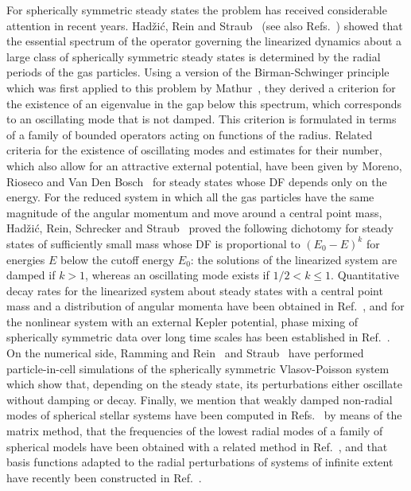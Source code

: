 For spherically symmetric steady states the problem has received considerable attention in recent years. Had\v{z}i\'c, Rein and Straub~\cite{mHgRcS22} (see also Refs.~\cite{Kunze-Book,mK22}) showed that the essential spectrum of the operator governing the linearized dynamics about a large class of spherically symmetric steady states is determined by the radial periods of the gas particles. Using a version of the Birman-Schwinger principle which was first applied to this problem by Mathur~\cite{sM90}, they derived a criterion for the existence of an eigenvalue in the gap below this spectrum, which corresponds to an oscillating mode that is not damped. This criterion is formulated in terms of a family of bounded operators acting on functions of the radius. Related criteria for the existence of oscillating modes and estimates for their number, which also allow for an attractive external potential, have been given by Moreno, Rioseco and Van Den Bosch~\cite{mMpRhV26} for steady states whose DF depends only on the energy. For the reduced system in which all the gas particles have the same magnitude of the angular momentum and move around a central point mass, Had\v{z}i\'c, Rein, Schrecker and Straub~\cite{mHgRmScS25} proved the following dichotomy for steady states of sufficiently small mass whose DF is proportional to $(E_0 - E)^k$ for energies $E$ below the cutoff energy $E_0$: the solutions of the linearized system are damped if $k > 1$, whereas an oscillating mode exists if $1/2 < k\leq 1$. Quantitative decay rates for the linearized system about steady states with a central point mass and a distribution of angular momenta have been obtained in Ref.~\cite{mHmS25}, and for the nonlinear system with an external Kepler potential, phase mixing of spherically symmetric data over long time scales has been established in Ref.~\cite{sCjL26}. On the numerical side, Ramming and Rein~\cite{tRgR18} and Straub~\cite{cS24} have performed particle-in-cell simulations of the spherically symmetric Vlasov-Poisson system which show that, depending on the steady state, its perturbations either oscillate without damping or decay. Finally, we mention that weakly damped non-radial modes of spherical stellar systems have been computed in Refs.~\cite{mW94,jFsP22} by means of the matrix method, that the frequencies of the lowest radial modes of a family of spherical models have been obtained with a related method in Ref.~\cite{pV04}, and that basis functions adapted to the radial perturbations of systems of infinite extent have recently been constructed in Ref.~\cite{ePiS26}.

